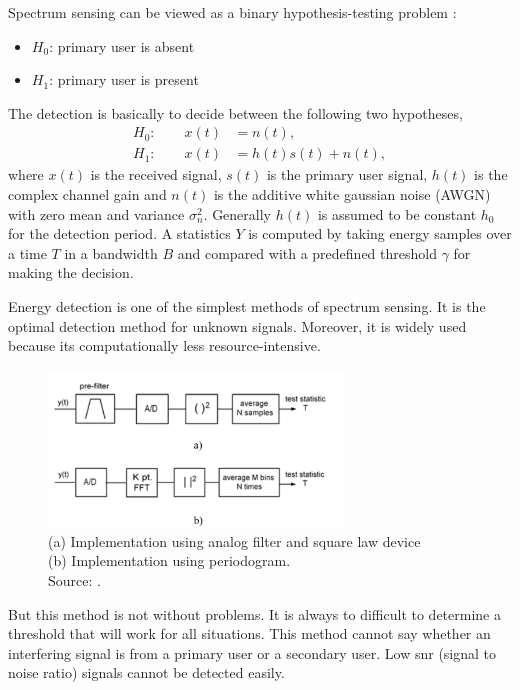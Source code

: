 Spectrum sensing can be viewed as a binary hypothesis-testing problem 
\cite{zhang09}:
\begin{itemize}[noitemsep,topsep=0pt,parsep=0pt,partopsep=0pt]
    \item $H_0$: primary user is absent
    \item $H_1$: primary user is present
\end{itemize}
The detection is basically to decide between the following two hypotheses,
\begin{align}
    H_0 : \qquad x(t) &= n(t),  \nonumber \\
    H_1 : \qquad x(t) &= h(t)s(t) + n(t),  \nonumber
\end{align}
where $x(t)$ is the received signal, $s(t)$ is the primary user signal, $h(t)$
is the complex channel gain and $n(t)$ is the additive white gaussian noise
(AWGN) with zero mean and variance $\sigma_n^2$. Generally $h(t)$ is assumed
to be constant $h_0$ for the detection period. A statistics $Y$ is computed by
taking energy samples over a time $T$ in a bandwidth $B$ and compared with a 
predefined threshold $\gamma$ for making the decision.

Energy detection is one of the simplest methods of spectrum sensing. It is the 
optimal detection method for unknown signals. Moreover, it is widely used 
because its computationally less resource-intensive.

\begin{figure}
    \centering
    \includegraphics[width=0.7\textwidth]{../images/energyDetection}
    \caption[Energy Detection block diagram]{(a) Implementation using analog 
    filter and square law device \\
    (b) Implementation using periodogram. \\
    Source: {\cite{cabric06}}.}
    \label{energyDetection}
\end{figure}

But this method is not without problems. It is always to difficult to 
determine a threshold that will work for all situations. This method cannot
say whether an interfering signal is from a primary user or a secondary user.
Low \gls{snr}  (signal to noise ratio) signals cannot be detected easily.


